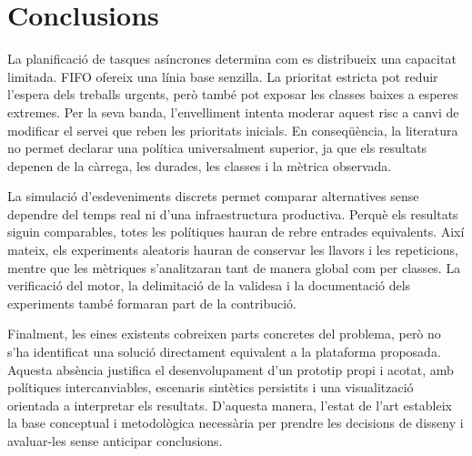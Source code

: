 \section{Conclusions}

La planificació de tasques asíncrones determina com es distribueix una capacitat
limitada. FIFO ofereix una línia base senzilla. La prioritat estricta pot reduir
l'espera dels treballs urgents, però també pot exposar les classes baixes a
esperes extremes. Per la seva banda, l'envelliment intenta moderar aquest risc a
canvi de modificar el servei que reben les prioritats inicials. En conseqüència,
la literatura no permet declarar una política universalment superior, ja que
els resultats depenen de la càrrega, les durades, les classes i la mètrica
observada.

La simulació d'esdeveniments discrets permet comparar alternatives sense
dependre del temps real ni d'una infraestructura productiva. Perquè els
resultats siguin comparables, totes les polítiques hauran de rebre entrades
equivalents. Així mateix, els experiments aleatoris hauran de conservar les
llavors i les repeticions, mentre que les mètriques s'analitzaran tant de manera
global com per classes. La verificació del motor, la delimitació de la validesa
i la documentació dels experiments també formaran part de la contribució.

Finalment, les eines existents cobreixen parts concretes del problema, però no
s'ha identificat una solució directament equivalent a la plataforma proposada.
Aquesta absència justifica el desenvolupament d'un prototip propi i acotat, amb
polítiques intercanviables, escenaris sintètics persistits i una visualització
orientada a interpretar els resultats. D'aquesta manera, l'estat de l'art
estableix la base conceptual i metodològica necessària per prendre les decisions
de disseny i avaluar-les sense anticipar conclusions.

